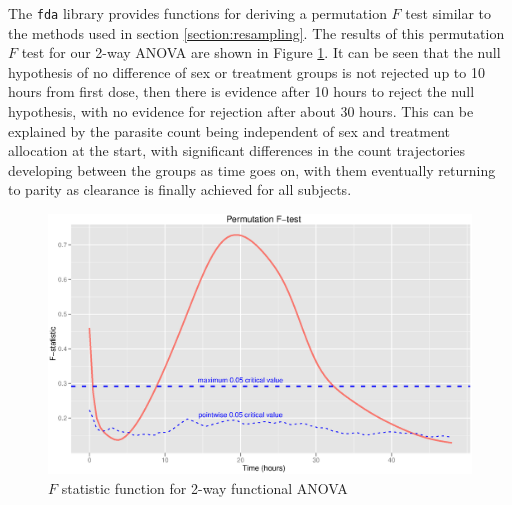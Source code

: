 The \texttt{fda} library provides functions for deriving a permutation $F$ test similar to the methods used in section \ref{section:resampling}. The results of this permutation $F$ test for our 2-way ANOVA are shown in Figure \ref{fdapermF}. It can be seen that the null hypothesis of no difference of sex or treatment groups is not rejected up to 10 hours from first dose, then there is evidence after 10 hours to reject the null hypothesis, with no evidence for rejection after about 30 hours. This can be explained by the parasite count being independent of sex and treatment allocation at the start, with significant differences in the count trajectories developing between the groups as time goes on, with them eventually returning to parity as clearance is finally achieved for all subjects.
\begin{figure}[h]
\includegraphics[width=150mm]{fdapermF.eps} 
\caption{$F$ statistic function for 2-way functional ANOVA}
\label{fdapermF}
\end{figure}

